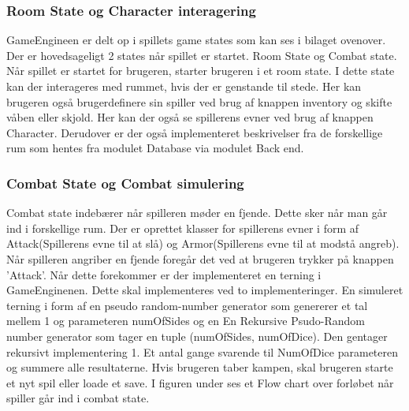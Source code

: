 \subsubsection{Room State og Character interagering}
GameEngineen er delt op i spillets game states som kan ses i bilaget ovenover. Der er hovedsageligt 2 states når spillet er startet. Room State og Combat state. Når spillet er startet for brugeren, starter brugeren i et room state. I dette state kan der interageres med rummet, hvis der er genstande til stede. Her kan brugeren også brugerdefinere sin spiller ved brug af knappen inventory og skifte våben eller skjold. Her kan der også se spillerens evner ved brug af knappen Character. Derudover er der også implementeret beskrivelser fra de forskellige rum som hentes fra modulet Database via modulet Back end.
\subsubsection{Combat State og Combat simulering}
Combat state indebærer når spilleren møder en fjende. Dette sker når man går ind i forskellige rum. Der er oprettet klasser for spillerens evner i form af Attack(Spillerens evne til at slå) og Armor(Spillerens evne til at modstå angreb). Når spilleren angriber en fjende foregår det ved at brugeren trykker på knappen ’Attack’. Når dette forekommer er der implementeret en terning i GameEnginenen. Dette skal implementeres ved to implementeringer. En simuleret terning i form af en pseudo random-number generator som genererer et tal mellem 1 og parameteren numOfSides og en  En Rekursive Psudo-Random number generator som tager en tuple (numOfSides, numOfDice). Den gentager rekursivt implementering 1. Et antal gange svarende til NumOfDice parameteren og summere alle resultaterne.  Hvis brugeren taber kampen, skal brugeren starte et nyt spil eller loade et save. I figuren under ses et Flow chart over forløbet når spiller går ind i combat state.
